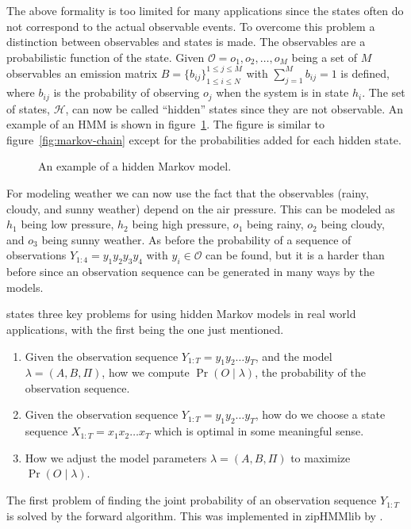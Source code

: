 The above formality is too limited for many applications since the states often do
not correspond to the actual observable events. To overcome this problem a
distinction between observables and states is made. The observables are a
probabilistic function of the state. Given
$\mathcal{O} = {o_1, o_2, \dots, o_M}$ being a set of $M$ observables an
emission matrix $B = {\{b_{ij}\}}_{1 \le i \le N}^{1 \le j \le M}$ with
$\sum_{j=1}^M b_{ij} = 1$ is defined, where $b_{ij}$ is the probability of
observing $o_j$ when the system is in state $h_i$. The set of states,
$\mathcal{H}$, can now be called ``hidden'' states since they are not
observable. An example of an HMM is shown in
figure~\ref{fig:hidden-markov-model}. The figure is similar to
figure~\ref{fig:markov-chain} except for the probabilities added for each
hidden state.

\begin{figure}
  \centering
  
  \caption{An example of a hidden Markov model.}
  \label{fig:hidden-markov-model}
\end{figure}

For modeling weather we can now use the fact that the observables (rainy,
cloudy, and sunny weather) depend on the air pressure. This can be modeled as
$h_1$ being low pressure, $h_2$ being high pressure, $o_1$ being rainy, $o_2$
being cloudy, and $o_3$ being sunny weather. As before the probability of a
sequence of observations $Y_{1:4} = y_1y_2y_3y_4$ with $y_i \in \mathcal{O}$
can be found, but it is a harder than before since an observation sequence can be
generated in many ways by the models.

\citet{rabiner1989tutorial} states three key problems for using hidden Markov
models in real world applications, with the first being the one just
mentioned.
\begin{enumerate}
\item Given the observation sequence $Y_{1:T} = y_1y_2\dots{}y_T$, and the
  model $\lambda = (A, B, \Pi)$, how we compute $\Pr(O \mid \lambda)$, the
  probability of the observation sequence.
\item Given the observation sequence $Y_{1:T} = y_1y_2\dots{}y_T$, how do we
  choose a state sequence $X_{1:T} = x_1x_2\dots{}x_T$ which is optimal in some
  meaningful sense.
\item How we adjust the model parameters $\lambda = (A, B, \Pi)$ to maximize
  $\Pr(O \mid \lambda)$.
\end{enumerate}

The first problem of finding the joint probability of an observation sequence
$Y_{1:T}$ is solved by the forward algorithm. This was implemented in zipHMMlib
by \citet{sand2013ziphmmlib}.

